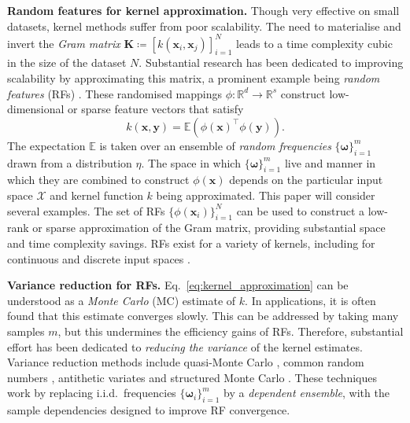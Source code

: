 \documentclass{article}
\newcommand{\pg}[1]{{\bf #1.}}
\begin{document}
\pg{Random features for kernel approximation} Though very effective on small datasets, kernel methods suffer from poor scalability. 
The need to materialise and invert the \emph{Gram matrix} $\mathbf{K} \coloneqq [k(\boldsymbol{x}_i,\boldsymbol{x}_j)]_{i=1}^N$ leads to a time complexity cubic in the size of the dataset $N$. 
Substantial research has been dedicated to improving scalability by approximating this matrix, a prominent example being \emph{random features} (RFs) \citep{rahimi2007random,rksink,avronkapralov, RF-survey}. 
These randomised mappings $\phi: \mathbb{R}^d \to \mathbb{R}^{s}$ construct low-dimensional or sparse feature vectors that satisfy
\begin{equation} \label{eq:kernel_approximation}
    k(\boldsymbol{x},\boldsymbol{y}) = \mathbb{E}\left(\phi(\boldsymbol{x})^\top \phi(\boldsymbol{y}) \right).
\end{equation}
The expectation $\mathbb{E}$ is taken over an ensemble of \emph{random frequencies} $\{\boldsymbol{\omega}\}_{i=1}^m$ drawn from a distribution $\mathcal{\eta}$.
The space in which $\{\boldsymbol{\omega}\}_{i=1}^m$ live and manner in which they are combined to construct $\phi(\boldsymbol{x})$ depends on the particular input space $\mathcal{X}$ and kernel function $k$ being approximated.
This paper will consider several examples.
The set of RFs $\{\phi(\boldsymbol{x}_i)\}_{i=1}^N$ can be used to construct a low-rank or sparse approximation of the Gram matrix, providing substantial space and time complexity savings. %
RFs exist for a variety of kernels, including for continuous and discrete input spaces \citep{dasgupta_jlt,johnson1984extensions,choromanski2020rethinking,goemans,rahimi2007random,graph_features, tripp2024tanimoto}.

\pg{Variance reduction for RFs} 
Eq.~\ref{eq:kernel_approximation} can be understood as a \emph{Monte Carlo} (MC) estimate of $k$.
In applications, it is often found that this estimate converges slowly. 
This can be addressed by taking many samples $m$, but this undermines the efficiency gains of RFs.
Therefore, substantial effort has been dedicated to \emph{reducing the variance} of the kernel estimates. 
Variance reduction methods include quasi-Monte Carlo \citep[QMC;][]{dick2013high, qmc-rf}, common random numbers \citep[CRNs;][]{glasserman1992some}, antithetic variates \citep{hammersley1956new} and structured Monte Carlo \citep[SMC;][]{yu2016orthogonal}. %
These techniques work by replacing i.i.d.~frequencies $\{\boldsymbol{\omega}_i\}_{i=1}^m$ by a \emph{dependent ensemble}, with the sample dependencies designed to improve RF convergence. 
\end{document}
